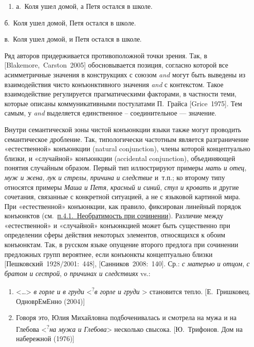 \begin{enumerate}
\def\labelenumi{(\arabic{enumi})}
\setcounter{enumi}{157}
\item
  а.~Коля ушел домой, а Петя остался в школе.
\end{enumerate}

б.~Коля ушел домой, Петя остался в школе.

в.~Коля ушел домой, и Петя остался в школе.

Ряд авторов придерживается противоположной точки зрения. Так, в
{[}Blakemore,~Carston~2005{]} обосновывается позиция, согласно которой
все асимметричные значения в конструкциях с союзом \textit{and} могут быть
выведены из взаимодействия чисто конъюнктивного значения \textit{and} с
контекстом. Такое взаимодействие регулируется прагматическими факторами,
в частности теми, которые описаны коммуникативными постулатами П.~Грайса
{[}Grice~1975{]}. Тем самым, у \textit{and} выделяется единственное --
соединительное --- значение.

Внутри семантической зоны чистой конъюнкции языки также могут проводить
семантическое дробление. Так, типологически частотным является
разграничение «естественной» конъюнкции (natural conjunction), члены
которой концептуально близки, и «случайной» конъюнкции (accidental
conjunction), объединяющей понятия случайным образом. Первый тип
иллюстрируют примеры \textit{мать и отец}, \textit{муж и жена}, \textit{лук и
стрелы}, \textit{причина и следствие} и~т.п.; ко второму типу относятся
примеры \textit{Маша и Петя}, \textit{красный и синий}, \textit{стул и
кровать} и другие сочетания, связанные с конкретной ситуацией, а не с
языковой картиной мира. При «естественной» конъюнкции, как правило,
фиксирован линейный порядок конъюнктов
(см.~\underline{п.4.1.~Необратимость при сочинении}). Различие между
«естественной» и «случайной» конъюнкцией может быть существенно при
определении сферы действия некоторых элементов, относящихся к обоим
конъюнктам. Так, в русском языке опущение второго предлога при сочинении
предложных групп вероятнее, если конъюнкты концептуально близки
{[}Пешковский~1928/2001:~448{]}, {[}Санников~2008:~140{]}. Ср.: \textit{с
матерью и отцом}, \textit{с братом и сестрой}, \textit{о причинах и
следствиях} vs.:

\begin{enumerate}
\def\labelenumi{(\arabic{enumi})}
\setcounter{enumi}{158}
\item
  \textless\ldots\textgreater{} \textit{в горле и в груди}
  \textless{}\textsuperscript{?}\textit{в горле и груди} \textgreater{}
  становится тепло. {[}Е.~Гришковец. ОдноврЕмЕнно (2004){]}
\item
  Говоря это, Юлия Михайловна подбоченивалась и смотрела на мужа и на
  Глебова \textless{}\textsuperscript{?}\textit{на мужа и
  Глебова}\textgreater{} несколько свысока. {[}Ю.~Трифонов. Дом на
  набережной (1976){]}
\end{enumerate}

